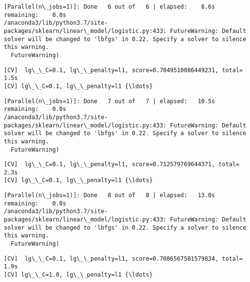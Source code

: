 \documentclass[11pt]{article}
\begin{document}
    \begin{Verbatim}[commandchars=\\\{\}]
[Parallel(n\_jobs=1)]: Done   6 out of   6 | elapsed:    8.6s remaining:    0.0s
/anaconda3/lib/python3.7/site-packages/sklearn/linear\_model/logistic.py:433: FutureWarning: Default solver will be changed to 'lbfgs' in 0.22. Specify a solver to silence this warning.
  FutureWarning)

    \end{Verbatim}

    \begin{Verbatim}[commandchars=\\\{\}]
[CV]  lg\_\_C=0.1, lg\_\_penalty=l1, score=0.7049510086449231, total=   1.5s
[CV] lg\_\_C=0.1, lg\_\_penalty=l1 {\ldots}

    \end{Verbatim}

    \begin{Verbatim}[commandchars=\\\{\}]
[Parallel(n\_jobs=1)]: Done   7 out of   7 | elapsed:   10.5s remaining:    0.0s
/anaconda3/lib/python3.7/site-packages/sklearn/linear\_model/logistic.py:433: FutureWarning: Default solver will be changed to 'lbfgs' in 0.22. Specify a solver to silence this warning.
  FutureWarning)

    \end{Verbatim}

    \begin{Verbatim}[commandchars=\\\{\}]
[CV]  lg\_\_C=0.1, lg\_\_penalty=l1, score=0.712579769644371, total=   2.3s
[CV] lg\_\_C=0.1, lg\_\_penalty=l1 {\ldots}

    \end{Verbatim}

    \begin{Verbatim}[commandchars=\\\{\}]
[Parallel(n\_jobs=1)]: Done   8 out of   8 | elapsed:   13.0s remaining:    0.0s
/anaconda3/lib/python3.7/site-packages/sklearn/linear\_model/logistic.py:433: FutureWarning: Default solver will be changed to 'lbfgs' in 0.22. Specify a solver to silence this warning.
  FutureWarning)

    \end{Verbatim}

    \begin{Verbatim}[commandchars=\\\{\}]
[CV]  lg\_\_C=0.1, lg\_\_penalty=l1, score=0.7086567501579834, total=   1.9s
[CV] lg\_\_C=1.0, lg\_\_penalty=l1 {\ldots}

    \end{Verbatim}
\end{document}
